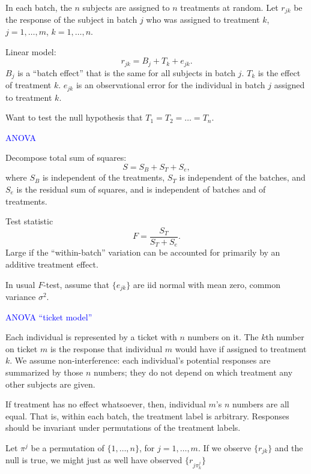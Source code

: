 \documentclass[landscape]{slides}
\newcommand{\beq}{\begin{equation}}
\newcommand{\eeq}{\end{equation}}
\begin{document}
\begin{slide}
\begin{slide}
In each batch, the $n$ subjects are assigned to $n$ treatments at random.
Let $r_{jk}$ be the response of the subject in batch $j$ who was assigned to
treatment $k$, $j = 1, \ldots, m$, $k = 1, \ldots, n$.

Linear model:
\beq
     r_{jk} = B_j + T_k + e_{jk}.
\eeq
$B_j$ is a ``batch effect'' that is the same for all subjects in batch $j$.
$T_k$ is the effect of treatment $k$.
$e_{jk}$ is an observational error for the individual in batch $j$ assigned to treatment $k$.

Want to test the null hypothesis that $T_1 = T_2 = \ldots = T_n$.

\end{slide}

\begin{slide}
{\textcolor{blue}{ANOVA}}

Decompose total sum of squares:
\beq
    S = S_B + S_T + S_e,
\eeq
where $S_B$ is independent of the treatments, $S_T$ is independent of
the batches, and $S_e$ is the residual sum of squares, and is independent
of batches and of treatments.

Test statistic
\beq
    F = \frac{S_T}{S_T + S_e}.
\eeq
Large if the ``within-batch'' variation can be accounted 
for primarily by an additive treatment effect.

In usual $F$-test, assume that $\{ e_{jk} \}$ are iid normal with mean zero,
common variance $\sigma^2$.

\end{slide}

\begin{slide}
{\textcolor{blue}{ANOVA ``ticket model''}}

Each individual is represented by a ticket with $n$ numbers on it.
The $k$th number on ticket $m$ is the response that individual $m$
would have if assigned to treatment $k$.
We assume non-interference: each individual's potential responses
are summarized by those $n$ numbers; they do not depend on which
treatment any other subjects are given.

If treatment has no effect whatsoever, then, individual $m$'s $n$ numbers
are all equal.
That is, within each batch, the treatment 
label is arbitrary.
Responses should be invariant under permutations of the treatment labels.

Let $\pi^j$ be a permutation of $\{1, \ldots, n\}$, for $j = 1, \ldots, m$.
If we observe $\{r_{jk} \}$ and the null is true, we might just as well have observed
$\{r_{j\pi_k^j}\}$


\end{slide}
\end{slide}
\end{document}

